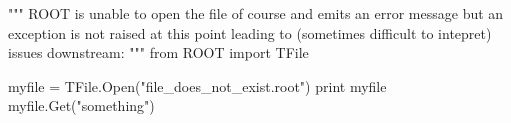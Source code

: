 \begin{footnotesize}
\begin{pyglist}[language=python,texcl=true,abovecaptionskip=0,style=vs,bgcolor=Moccasin]
"""
ROOT is unable to open the file of course and emits an error message but an
exception is not raised at this point leading to (sometimes difficult to
intepret) issues downstream:
"""
from ROOT import TFile

myfile = TFile.Open("file_does_not_exist.root")
print myfile
myfile.Get("something")
\end{pyglist}
\end{footnotesize}
